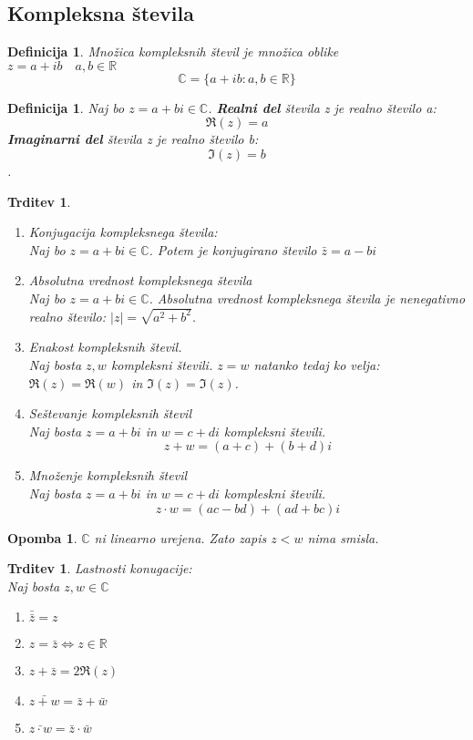 \documentclass[11pt]{article}
\newtheorem{Trditev}[Izrek]{{\sc Trditev}}
\newtheorem{Definicija}[Izrek]{{\sc Definicija}}
\newtheorem{Opomba}[Izrek]{{\sc Opomba}}
\begin{document}
\subsection{Kompleksna števila}
\begin{Definicija}
	Množica kompleksnih števil je množica oblike \\ $z = a + ib \quad a,b\in \mathbb{R}$
	$$\mathbb{C} = \{a + ib: a,b\in \mathbb{R}\}$$
\end{Definicija}
\begin{Definicija}
	Naj bo $ z = a +bi \in \mathbb{C}$. \textbf{Realni del} števila z je realno število a: $$\Re(z) = a$$
	\textbf{ Imaginarni del} števila z je realno število b: $$\Im(z) = b$$.
\end{Definicija}
\begin{Trditev}
	\begin{enumerate}
		\item
		Konjugacija kompleksnega števila:
		\\ 
		Naj bo $ z = a +bi \in \mathbb{C}$. Potem je konjugirano število $\bar{z} = a - bi$
		\item
		Absolutna vrednost kompleksnega števila
		\\
		Naj bo $z = a+bi \in \mathbb{C}$. Absolutna vrednost kompleksnega števila je nenegativno realno število: $|z| = \sqrt{a^2 + b^2}$.
		\item
		Enakost kompleksnih števil.
		\\
		Naj bosta $z, w$ kompleksni števili. $z =w$ natanko tedaj ko velja: $\Re(z) = \Re(w)$ in $\Im(z) =\Im(z)$.
		\item
		Seštevanje kompleksnih števil
		\\
		Naj bosta $z = a+ bi$ in $w = c+ di$ kompleksni števili. $$z + w = (a+c) + (b+d)i$$
		\item
		Množenje kompleksnih števil
		\\
		Naj bosta $z = a+bi$ in $ w = c + di$ kompleskni števili.
		$$ z\cdot w = (ac - bd) + (ad + bc)i$$
	\end{enumerate}
\end{Trditev}
\begin{Opomba}
	$\mathbb{C}$ ni linearno urejena. Zato zapis $z < w$ nima smisla.
\end{Opomba}
\begin{Trditev}
	Lastnosti konugacije:
	\\
	Naj bosta $z,w \in \mathbb{C}$
	\begin{enumerate}
		\item
		$\bar{\bar{z}} = z$
		\item
		$ z =\bar{z} \iff z \in \mathbb{R}$
		\item
		$ z + \bar{z} = 2\Re(z)$
		\item
		$\bar{z+w} = \bar{z} + \bar{w}$
		\item
		$\bar{z\cdot w} = \bar{z}\cdot \bar{w}$
	\end{enumerate}
\end{Trditev}
\end{document}
